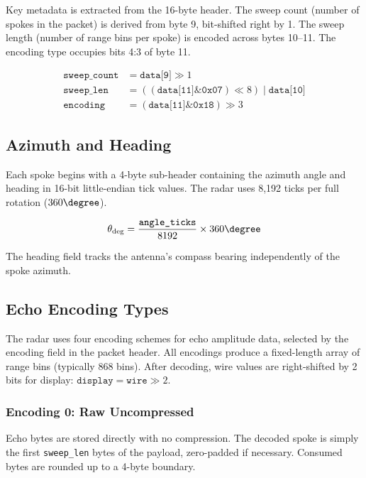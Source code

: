 \documentclass[11pt,letterpaper]{article}
\begin{document}
Key metadata is extracted from the 16-byte header. The sweep count (number of spokes in the packet) is derived from byte 9, bit-shifted right by 1. The sweep length (number of range bins per spoke) is encoded across bytes 10--11. The encoding type occupies bits 4:3 of byte 11.

\begin{align}
\texttt{sweep\_count} &= \texttt{data[9]} \gg 1 \\
\texttt{sweep\_len} &= ((\texttt{data[11]} \mathbin{\&} \texttt{0x07}) \ll 8) \mathbin{|} \texttt{data[10]} \\
\texttt{encoding} &= (\texttt{data[11]} \mathbin{\&} \texttt{0x18}) \gg 3
\end{align}


\subsection{Azimuth and Heading}

Each spoke begins with a 4-byte sub-header containing the azimuth angle and heading in 16-bit little-endian tick values. The radar uses 8{,}192 ticks per full rotation ($360\degree$).

\begin{equation}
\theta_{\text{deg}} = \frac{\texttt{angle\_ticks}}{8192} \times 360\degree
\end{equation}

The heading field tracks the antenna's compass bearing independently of the spoke azimuth.


\subsection{Echo Encoding Types}
\label{sec:encoding}

The radar uses four encoding schemes for echo amplitude data, selected by the encoding field in the packet header. All encodings produce a fixed-length array of range bins (typically 868 bins). After decoding, wire values are right-shifted by 2 bits for display: $\texttt{display} = \texttt{wire} \gg 2$.

\subsubsection{Encoding 0: Raw Uncompressed}

Echo bytes are stored directly with no compression. The decoded spoke is simply the first \texttt{sweep\_len} bytes of the payload, zero-padded if necessary. Consumed bytes are rounded up to a 4-byte boundary.
\end{document}
